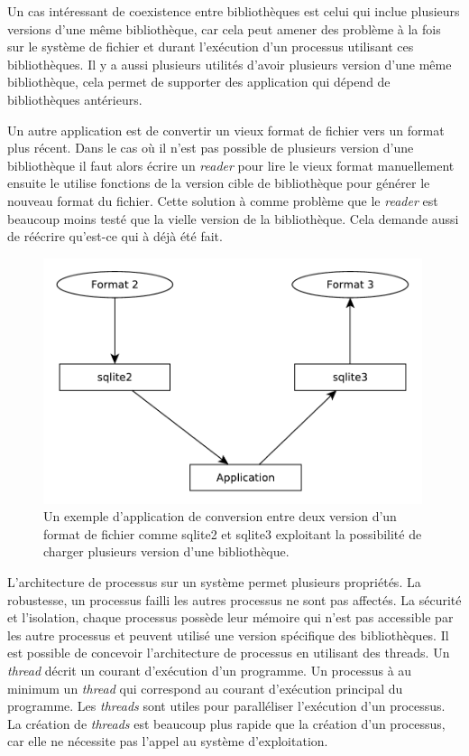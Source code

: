 Un cas intéressant de coexistence entre bibliothèques est celui qui inclue
plusieurs versions d'une même bibliothèque, car cela peut amener des problème
à la fois sur le système de fichier et durant l'exécution d'un processus utilisant
ces bibliothèques. Il y a aussi plusieurs utilités d'avoir plusieurs version
d'une même bibliothèque, cela permet de supporter des application qui dépend de
bibliothèques antérieurs.

Un autre application est de convertir un vieux format de fichier vers un format
plus récent. Dans le cas où il n'est pas possible de plusieurs version d'une bibliothèque
il faut alors écrire un \textit{reader} pour lire le vieux format manuellement ensuite le
utilise fonctions de la version cible de bibliothèque pour générer le nouveau format du fichier.
Cette solution à comme problème que le \textit{reader} est beaucoup moins testé que la
vielle version de la bibliothèque. Cela demande aussi de réécrire qu'est-ce qui à déjà été fait.

\begin{figure}[ht]
  \includegraphics[width=30em]{figures/app_convert_v1_to_v2.pdf}
  \caption{Un exemple d'application de conversion entre deux version d'un format
  de fichier comme sqlite2 et sqlite3 exploitant la possibilité de charger plusieurs
  version d'une bibliothèque.}
\end{figure}

L'architecture de processus sur un système permet plusieurs propriétés. La
robustesse, un processus failli les autres processus ne sont pas affectés. La
sécurité et l'isolation, chaque processus possède leur mémoire qui n'est pas
accessible par les autre processus et peuvent utilisé une version spécifique
des bibliothèques. Il est possible de concevoir l'architecture de processus en
utilisant des threads.  Un \textit{thread} décrit un courant d'exécution d'un
programme. Un processus à au minimum un \textit{thread} qui correspond au
courant d'exécution principal du programme. Les \textit{threads} sont utiles
pour paralléliser l'exécution d'un processus. La création de \textit{threads}
est beaucoup plus rapide que la création d'un processus, car elle ne nécessite
pas l'appel au système d'exploitation.

